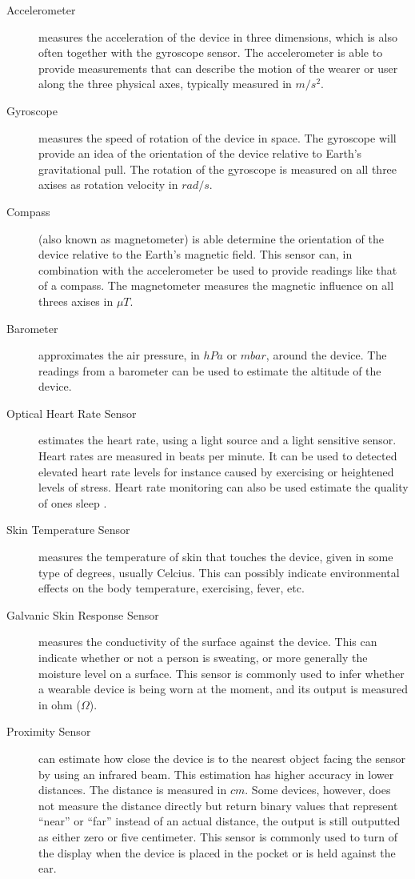 \begin{description}
	\item[Accelerometer] measures the acceleration of the device in three dimensions, which is also often together with the gyroscope sensor. The accelerometer is able to provide measurements that can describe the motion of the wearer or user along the three physical axes, typically measured in $m/s^2$.
	\item[Gyroscope] measures the speed of rotation of the device in space. The gyroscope will provide an idea of the orientation of the device relative to Earth's gravitational pull. The rotation of the gyroscope is measured on all three axises as rotation velocity in $rad/s$.
	\item[Compass] (also known as magnetometer) is able determine the orientation of the device relative to the Earth's magnetic field. This sensor can, in combination with the accelerometer be used to provide readings like that of a compass. The magnetometer measures the magnetic influence on all threes axises in $\mu T$.
	\item[Barometer] approximates the air pressure, in $hPa$ or $mbar$, around the device. The readings from a barometer can be used to estimate the altitude of the device.
    \item[Optical Heart Rate Sensor] estimates the heart rate, using a light source and a light sensitive sensor. Heart rates are measured in beats per minute. It can be used to detected elevated heart rate levels for instance caused by exercising or heightened levels of stress. Heart rate monitoring can also be used estimate the quality of ones sleep \parencite{guardian_fitness_tracker_rem_sleep}. 
    \item[Skin Temperature Sensor] measures the temperature of skin that touches the device, given in some type of degrees, usually Celcius. This can possibly indicate environmental effects on the body temperature, exercising, fever, etc.
    \item[Galvanic Skin Response Sensor] measures the conductivity of the surface against the device. This can indicate whether or not a person is sweating, or more generally the moisture level on a surface. This sensor is commonly used to infer whether a wearable device is being worn at the moment, and its output is measured in ohm ($\Omega$).
    \item[Proximity Sensor] can estimate how close the device is to the nearest object facing the sensor by using an infrared beam. This estimation has higher accuracy in lower distances. The distance is measured in $cm$. Some devices, however, does not measure the distance directly but return binary values that represent ``near'' or ``far'' instead of an actual distance, the output is still outputted as either zero or five centimeter. This sensor is commonly used to turn of the display when the device is placed in the pocket or is held against the ear.

\end{description}

